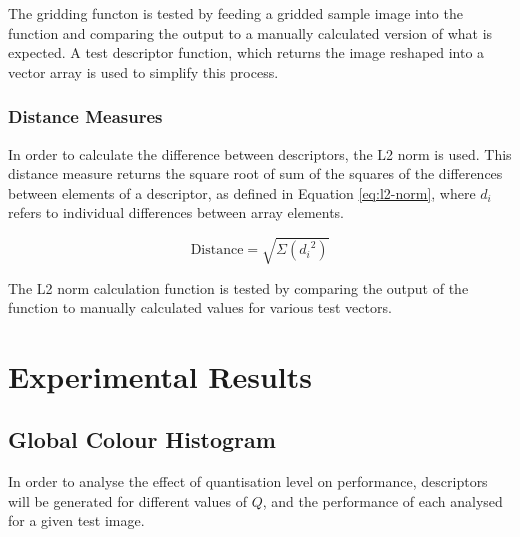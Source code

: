 The gridding functon is tested by feeding a gridded sample image into the function and comparing the output to a manually calculated version of what is expected. A test descriptor function, which returns the image reshaped into a vector array is used to simplify this process.

\subsection{Distance Measures} \label{sec:distance-measures}

In order to calculate the difference between descriptors, the L2 norm is used. This distance measure returns the square root of sum of the squares of the differences between elements of a descriptor, as defined in Equation \ref{eq:l2-norm}, where $d_i$ refers to individual differences between array elements.

\begin{equation}
	\text{Distance} = \sqrt{ \Sigma{ ({d_i}^2)} }
	\label{eq:l2-norm}
\end{equation}

The L2 norm calculation function is tested by comparing the output of the function to manually calculated values for various test vectors.

\chapter{Experimental Results} \label{sec:results}

\section{Global Colour Histogram} \label{sec:global-colour-histogram-results}

In order to analyse the effect of quantisation level on performance, descriptors will be generated for different values of $Q$, and the performance of each analysed for a given test image.

